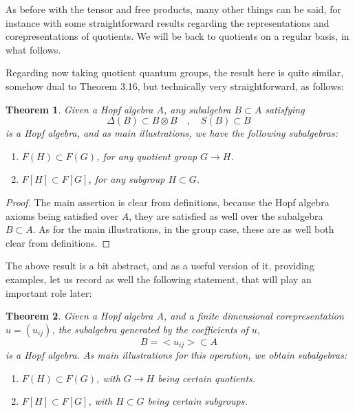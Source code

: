 \documentclass[12pt]{amsbook}
\newtheorem{theorem}{Theorem}[chapter]
\begin{document}
As before with the tensor and free products, many other things can be said, for instance with some straightforward results regarding the representations and corepresentations of quotients. We will be back to quotients on a regular basis, in what follows.

\bigskip

Regarding now taking quotient quantum groups, the result here is quite similar, somehow dual to Theorem 3.16, but technically very straightforward, as follows:


\begin{theorem}
Given a Hopf algebra $A$, any subalgebra $B\subset A$ satisfying
$$\Delta(B)\subset B\otimes B\quad,\quad S(B)\subset B$$
is a Hopf algebra, and as main illustrations, we have the following subalgebras:
\begin{enumerate}
\item $F(H)\subset F(G)$, for any quotient group $G\to H$.

\item $F[H]\subset F[G]$, for any subgroup $H\subset G$.
\end{enumerate}
\end{theorem}

\begin{proof}
The main assertion is clear from definitions, because the Hopf algebra axioms being satisfied over $A$, they are satisfied as well over the subalgebra $B\subset A$. As for the main illustrations, in the group case, these are as well both clear from definitions.
\end{proof}

The above result is a bit abstract, and as a useful version of it, providing examples, let us record as well the following statement, that will play an important role later:

\begin{theorem}
Given a Hopf algebra $A$, and a finite dimensional corepresentation $u=(u_{ij})$, the subalgebra generated by the coefficients of $u$,
$$B=<u_{ij}>\subset A$$
is a Hopf algebra. As main illustrations for this operation, we obtain subalgebras:
\begin{enumerate}
\item $F(H)\subset F(G)$, with $G\to H$ being certain quotients.

\item $F[H]\subset F[G]$, with $H\subset G$ being certain subgroups.
\end{enumerate}
\end{theorem}
\end{document}
